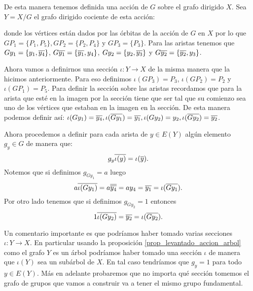 \documentclass[tesis.tex]{subfiles}
\begin{document}
\begin{ej}
	
	De esta manera tenemos definida una acción de $G$ sobre el grafo dirigido $X$.
	Sea $Y=X/G$ el grafo dirigido cociente de esta acción:
	\begin{center}
	\end{center}
	donde los vértices están dados por las órbitas de la acción de $G$ en $X$  por lo que $GP_1 = \{ P_1, P_5 \}, GP_2 = \{ P_2, P_4  \}$ y $GP_3 = \{ P_3 \}$. Para las aristas tenemos que $Gy_1 = \{ y_1, \overline{y_4} \}$, $ {G \overline{y_1}} = \{ \overline{y_1}, y_4 \}$, $Gy_2 = \{ y_2, \overline{y_3} \}$ y ${G \overline{y_2}} = \{ \overline{y_2}, {y_3} \}$.
	
	Ahora vamos a definirnos una sección $\iota: Y \to X$ de la misma manera que la hicimos anteriormente.
	Para eso definimos $\iota(GP_3) = P_3$, $\iota(GP_2) = P_2$ y $\iota(GP_1) = P_5$.
	Para definir la sección sobre las aristas recordamos que para la arista que esté en la imagen por la sección tiene que ser tal que su comienzo sea uno de los vértices que estaban en la imagen en la sección.
	De esta manera podemos definir así:
	$\iota(Gy_1) = \overline{y_4}, \iota(\overline{Gy_1}) = \overline{y_1}, \iota(Gy_2) = y_2, \iota(\overline{Gy_2}) = \overline{y_2}$.
	
	
	Ahora procedemos a definir para cada arista de $y \in E(Y)$ algún elemento $g_{y} \in G$ de manera que:
	\[
	g_y \overline{\iota(y)} = \iota(\overline y).
	\]
	Notemos que si definimos $g_{Gy_1} = a$ luego 
	\[
	a \overline{\iota(Gy_1)} = a\overline{\overline{ y_4}} = ay_4 = \overline{ y_1} = \iota({\overline{ Gy_1}}). 
	\] 
	Por otro lado tenemos que si definimos $g_{Gy_2} = 1$ entonces
	\[
	1 \overline{\iota(Gy_2)} = \overline{y_2} = \iota({\overline{Gy_2}}). 
	\]
	
	
	Un comentario importante es que podríamos haber tomado varias secciones $\iota: Y \to X$. 
	En particular usando la proposición \ref{prop_levantado_accion_arbol} como el grafo $Y$ es un árbol podríamos haber tomado una sección $\iota$ de manera que $\iota(Y)$ sea un subárbol de $X$.
	En tal caso tendríamos que $g_y = 1$ para todo $y \in E(Y)$.
	Más en adelante probaremos que no importa qué sección tomemos el grafo de grupos que vamos a construir va a tener el mismo grupo fundamental.
\end{ej}
\end{document}
